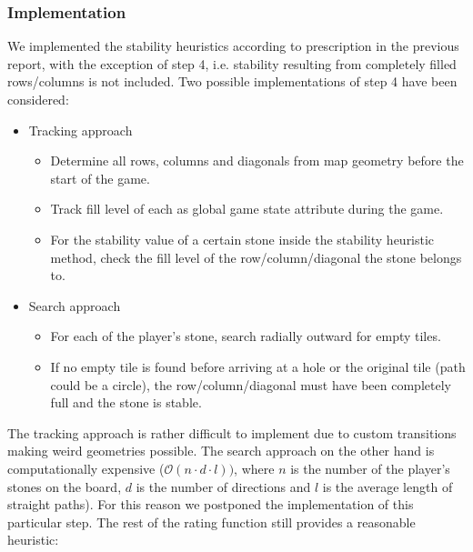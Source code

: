 \documentclass[a4paper,12pt]{article}
\begin{document}
    \subsubsection{Implementation}
    We implemented the stability heuristics according to prescription in the previous report, with the exception of step 4, i.e. stability resulting from completely filled rows/columns is not included. Two possible implementations of step 4 have been considered: 
    \begin{itemize}
        \item Tracking approach 
        \begin{itemize}
            \item Determine all rows, columns and diagonals from map geometry before the start of the game.
            \item Track fill level of each as global game state attribute during the game.
            \item For the stability value of a certain stone inside the stability heuristic method, check the fill level of the row/column/diagonal the stone belongs to. 
        \end{itemize}
        \item Search approach
        \begin{itemize}
            \item For each of the player's stone, search radially outward for empty tiles.
            \item If no empty tile is found before arriving at a hole or the original tile (path could be a circle), the row/column/diagonal must have been completely full and the stone is stable. 
        \end{itemize}
    \end{itemize}
    The tracking approach is rather difficult to implement due to custom transitions making weird geometries possible. The search approach on the other hand is computationally expensive ($\mathcal{O}(n \cdot d \cdot l))$, where $n$ is the number of the player's stones on the board, $d$ is the number of directions and $l$ is the average length of straight paths). For this reason we postponed the implementation of this particular step. The rest of the rating function still provides a reasonable heuristic: 
\end{document}

